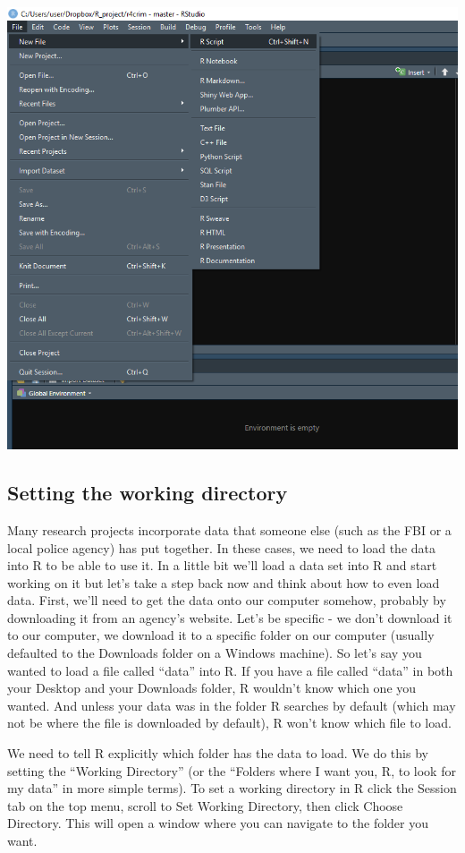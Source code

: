 \documentclass[
  12pt,
]{book}
\begin{document}
\includegraphics{images/rstudio_2.PNG}

\hypertarget{setting-the-working-directory}{%
\subsection{Setting the working directory}\label{setting-the-working-directory}}

Many research projects incorporate data that someone else (such as the FBI or a local police agency) has put together. In these cases, we need to load the data into R to be able to use it. In a little bit we'll load a data set into R and start working on it but let's take a step back now and think about how to even load data. First, we'll need to get the data onto our computer somehow, probably by downloading it from an agency's website. Let's be specific - we don't download it to our computer, we download it to a specific folder on our computer (usually defaulted to the Downloads folder on a Windows machine). So let's say you wanted to load a file called ``data'' into R. If you have a file called ``data'' in both your Desktop and your Downloads folder, R wouldn't know which one you wanted. And unless your data was in the folder R searches by default (which may not be where the file is downloaded by default), R won't know which file to load.

We need to tell R explicitly which folder has the data to load. We do this by setting the ``Working Directory'' (or the ``Folders where I want you, R, to look for my data'' in more simple terms). To set a working directory in R click the Session tab on the top menu, scroll to Set Working Directory, then click Choose Directory. This will open a window where you can navigate to the folder you want.
\end{document}
